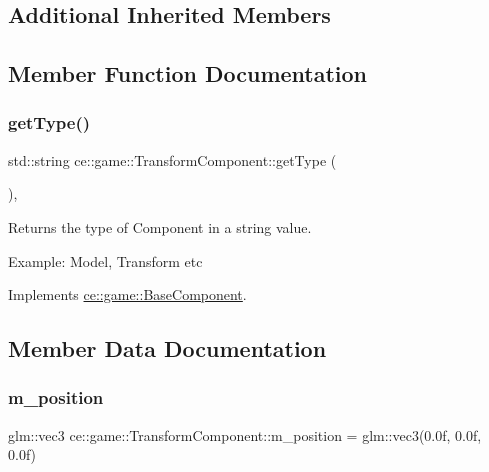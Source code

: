 \subsection*{Additional Inherited Members}


\subsection{Member Function Documentation}
\mbox{\label{classce_1_1game_1_1_transform_component_ae4a2729b3f88a77b8405de317ab03510}} 
\subsubsection{\texorpdfstring{get\+Type()}{getType()}}
{\footnotesize\ttfamily std\+::string ce\+::game\+::\+Transform\+Component\+::get\+Type (\begin{DoxyParamCaption}{ }\end{DoxyParamCaption})\hspace{0.3cm}{\ttfamily [override]}, {\ttfamily [virtual]}}



Returns the type of Component in a string value. 

Example\+: Model, Transform etc 

Implements \hyperlink{classce_1_1game_1_1_base_component_a1022b55c1926a019a2b3a71fb6b9150e}{ce\+::game\+::\+Base\+Component}.



\subsection{Member Data Documentation}
\mbox{\label{classce_1_1game_1_1_transform_component_a72b0b9f989fd7ddcecf0ebec18bd2076}} 
\subsubsection{\texorpdfstring{m\+\_\+position}{m\_position}}
{\footnotesize\ttfamily glm\+::vec3 ce\+::game\+::\+Transform\+Component\+::m\+\_\+position = glm\+::vec3(0.\+0f, 0.\+0f, 0.\+0f)\hspace{0.3cm}{\ttfamily [protected]}}



